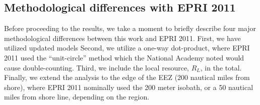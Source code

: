 \subsection{Methodological differences with EPRI 2011}
\label{sec:method:changes}

Before proceeding to the results, we take a moment to briefly describe four major methodological differences between this work and EPRI 2011. First, we have utilized updated models  Second, we utilize a one-way dot-product, where EPRI 2011 used the ``unit-circle'' method which the National Academy noted would cause double-counting. Third, we include the local resource, $R_L$, in the total. Finally, we extend the analysis to the edge of the EEZ (200 nautical miles from shore), where EPRI 2011 nominally used the 200 meter isobath, or a 50 nautical miles from shore line, depending on the region.

